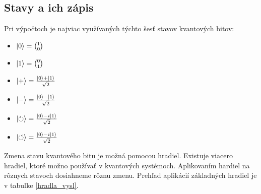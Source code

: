 \subsection{Stavy a ich zápis}

Pri výpočtoch je najviac využívaných týchto šesť stavov kvantových bitov:
\begin{itemize}
\item[] \(\Ket{0} = \binom{1}{0}\)
\item[] \(\Ket{1} = \binom{0}{1}\)
\item[] \(\Ket{+} = \frac{\Ket{0} + \Ket{1}}{\sqrt{2}}\)
\item[] \(\Ket{-} = \frac{\Ket{0} - \Ket{1}}{\sqrt{2}}\)
\item[] \(\Ket{\circlearrowright} = \frac{\Ket{0} - i\Ket{1}}{\sqrt{2}}\)
\item[] \(\Ket{\circlearrowleft} = \frac{\Ket{0} - i\Ket{1}}{\sqrt{2}}\)
\end{itemize}

Zmena stavu kvantového bitu je možná pomocou hradiel. Existuje viacero
hradiel, ktoré možno používať v kvantových systémoch. Aplikovaním hardiel
na rôznych stavoch dosiahneme rôznu zmenu. Prehľad aplikácií základných 
hradiel je v tabuľke \ref{hradla_vysl}.

